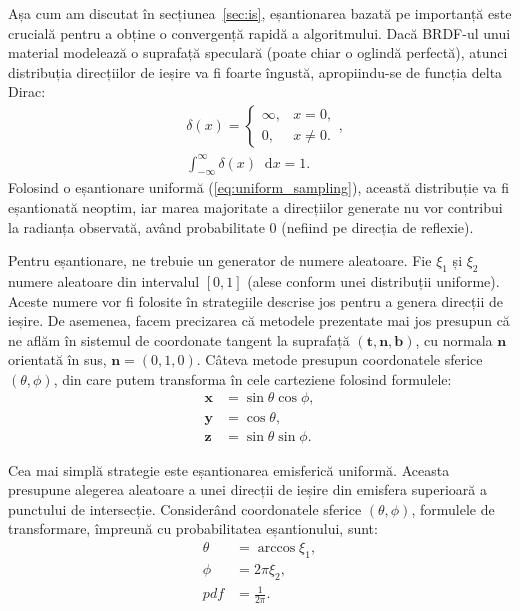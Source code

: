 \documentclass[12pt,a4paper]{report}
\newcommand*\diff{\mathop{}\!\mathrm{d}}
\numberwithin{equation}{section} %
\begin{document}
Așa cum am discutat în
secțiunea~\ref{sec:is}, eșantionarea bazată pe importanță este crucială pentru
a obține o convergență rapidă a algoritmului. Dacă BRDF-ul unui material modelează
o suprafață speculară (poate chiar o oglindă perfectă), atunci distribuția
direcțiilor de ieșire va fi foarte îngustă, apropiindu-se de funcția delta Dirac:
\begin{equation}
	\begin{aligned}
		 & \delta(x) = \begin{cases}
			               \infty, & x = 0,    \\
			               0,      & x \neq 0.
		               \end{cases},                \\
		 & \int_{-\infty}^{\infty} \delta(x) \diff x = 1.
	\end{aligned}
\end{equation}
Folosind o eșantionare uniformă (\ref{eq:uniform_sampling}), această distribuție va fi eșantionată neoptim,
iar marea majoritate a direcțiilor generate nu vor contribui la radianța observată,
având probabilitate 0 (nefiind pe direcția de reflexie).

Pentru eșantionare, ne trebuie un generator de numere aleatoare. Fie $\xi_1$ și $\xi_2$
numere aleatoare din intervalul $[0, 1]$ (alese conform unei distribuții uniforme).
Aceste numere vor fi folosite în strategiile descrise jos pentru a genera direcții
de ieșire. De asemenea, facem precizarea că metodele prezentate mai jos presupun
că ne aflăm în sistemul de coordonate tangent la suprafață $(\mathbf{t}, \mathbf{n}, \mathbf{b})$, cu normala $\mathbf{n}$
orientată în sus, $\mathbf{n} = (0, 1, 0)$. Câteva metode presupun coordonatele sferice $(\theta, \phi)$,
din care putem transforma în cele carteziene folosind formulele:
\begin{equation}
	\begin{aligned}
		\mathbf{x} &= \sin \theta \cos \phi, \\
		\mathbf{y} &= \cos \theta,           \\
		\mathbf{z} &= \sin \theta \sin \phi.
	\end{aligned}
\end{equation}

Cea mai simplă strategie este eșantionarea emisferică uniformă. Aceasta presupune
alegerea aleatoare a unei direcții de ieșire din emisfera superioară a punctului
de intersecție. Considerând coordonatele sferice $(\theta, \phi)$, formulele
de transformare, împreună cu probabilitatea eșantionului, sunt:
\begin{equation}\label{eq:uniform_sampling}
	\begin{aligned}
		\theta &= \arccos \xi_1, \\
		\phi   &= 2\pi \xi_2,	 \\
		pdf    &= \frac{1}{2\pi}.
	\end{aligned}
\end{equation}
\end{document}
